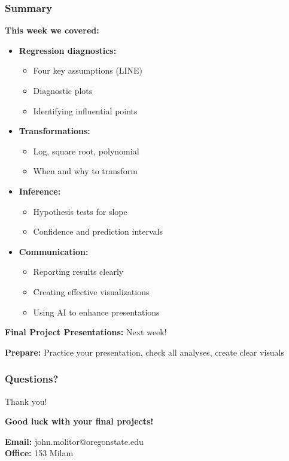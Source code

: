 \documentclass{beamer}
\begin{document}
\begin{frame}
\frametitle{Summary}
\textbf{This week we covered:}
\begin{itemize}
\item \textbf{Regression diagnostics:}
  \begin{itemize}
  \item Four key assumptions (LINE)
  \item Diagnostic plots
  \item Identifying influential points
  \end{itemize}

\item \textbf{Transformations:}
  \begin{itemize}
  \item Log, square root, polynomial
  \item When and why to transform
  \end{itemize}

\item \textbf{Inference:}
  \begin{itemize}
  \item Hypothesis tests for slope
  \item Confidence and prediction intervals
  \end{itemize}

\item \textbf{Communication:}
  \begin{itemize}
  \item Reporting results clearly
  \item Creating effective visualizations
  \item Using AI to enhance presentations
  \end{itemize}
\end{itemize}

\vspace{0.5cm}
\textbf{Final Project Presentations:} Next week!

\vspace{0.3cm}
\textbf{Prepare:} Practice your presentation, check all analyses, create clear visuals
\end{frame}

\begin{frame}
\frametitle{Questions?}
\begin{center}
\Large{Thank you!}

\vspace{0.5cm}

\textbf{Good luck with your final projects!}

\vspace{1cm}

\textbf{Email:} john.molitor@oregonstate.edu\\
\textbf{Office:} 153 Milam
\end{center}
\end{frame}
\end{document}
